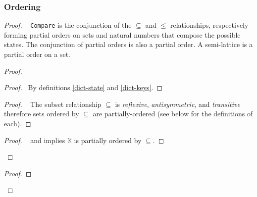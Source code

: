 \documentclass[11pt, oneside]{article}   	%
\begin{document}
\subsubsection{Ordering}
\label{sec:longer-proofs:ordering}

\begin{proof}
		\pfsketch~ \texttt{Compare} is the conjunction of the $\subseteq$ and $\leq$ relationships, respectively forming partial orders on sets and natural numbers that compose the possible states. The conjunction of partial orders is also a partial order. A semi-lattice is a partial order on a set.
		\begin{proof}
		
			\begin{proof}
				\pf~By definitions \ref{dict-state} and \ref{dict-keys}.
			\end{proof}
			
			\begin{proof}
				\pf~ The subset relationship $\subseteq$ is \textit{reflexive}, \textit{antisymmetric}, and \textit{transitive} therefore sets ordered by $\subseteq$ are partially-ordered (see below for the definitions of each).
			\end{proof}
			
			\qedstep
			 \begin{proof}
			  	\pf~ and  implies $\mathds{K}$ is partially ordered by $\subseteq$.
			\end{proof}
		\end{proof}
		
		\begin{proof}
		

\end{proof}
\end{proof}
\end{document}
